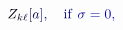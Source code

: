\documentclass[12pt]{article}
\begin{document}
\makeatletter
\renewcommand*{\@textcolor}[3]{%
  \protect\leavevmode
  \begingroup
    \color#1{#2}#3%
  \endgroup
}
\makeatother
\begin{displaymath}
\mathcolor[RGB]{0,0,15}{Z} _ { \mathcolor[RGB]{0,0,30}{k} \mathcolor[RGB]{0,0,45}{\ell} } \mathcolor[RGB]{0,0,60}{[} \mathcolor[RGB]{0,0,75}{a} \mathcolor[RGB]{0,0,90}{]} \mathcolor[RGB]{0,0,105}{,} \quad \mathrm { \mathcolor[RGB]{0,0,120}{i} \mathcolor[RGB]{0,0,135}{f} \ } \mathcolor[RGB]{0,0,150}{\sigma} \mathcolor[RGB]{0,0,165}{=} \mathcolor[RGB]{0,0,180}{0} \mathcolor[RGB]{0,0,195}{,} \,
\end{displaymath}
\end{document}
